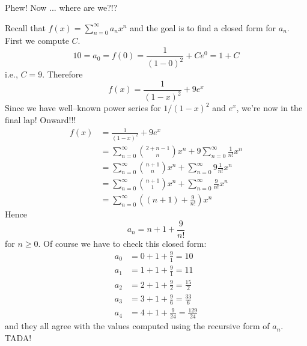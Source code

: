 Phew!
Now ... where are we?!?

Recall that $f(x) = \sum_{n=0}^\infty a_n x^n$ and the goal is to
find a closed form for $a_n$.
First we compute $C$.
\[
10 = a_0 = f(0) = \frac{1}{(1-0)^2} + C e^{0} = 1 + C
\]
i.e., $C = 9$.
Therefore
\[
f(x)
= \frac{1}{(1-x)^2} + 9 e^{x}
\]
Since we have well--known power series for $1/(1-x)^2$ and $e^x$,
we're now in the final lap!
Onward!!!
\begin{align*}
f(x)
&= \frac{1}{(1-x)^2} + 9 e^{x} \\
&= \sum_{n=0}^\infty \binom{2 + n - 1}{n} x^n
   + 9 \sum_{n=0}^\infty \frac{1}{n!}x^n
   \\
&= \sum_{n=0}^\infty \binom{n+1}{n} x^n
   + \sum_{n=0}^\infty 9 \frac{1}{n!}x^n
   \\
&= \sum_{n=0}^\infty \binom{n+1}{1} x^n
   + \sum_{n=0}^\infty \frac{9}{n!}x^n
   \\
&= \sum_{n=0}^\infty
   \left( (n+1) 
   + \frac{9}{n!} \right)
   x^n
\end{align*}
Hence
\[
a_n = n + 1 + \frac{9}{n!}
\]
for $n \geq 0$.
Of course we have to check this closed form:
\begin{align*}
a_0 &= 0 + 1 + \frac{9}{1} = 10 \\
a_1 &= 1 + 1 + \frac{9}{1} = 11 \\
a_2 &= 2 + 1 + \frac{9}{2} = \frac{15}{2} \\
a_3 &= 3 + 1 + \frac{9}{6} = \frac{33}{6} \\
a_4 &= 4 + 1 + \frac{9}{24} = \frac{129}{24}
\end{align*}
and they all agree with the values computed using the
recursive form of $a_n$.
TADA!

